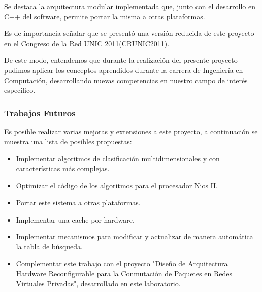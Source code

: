 Se destaca la arquitectura modular implementada que, junto con el desarrollo en C++ del software, permite portar la misma a otras plataformas.

Es de importancia señalar que se presentó una versión reducida de este proyecto en el Congreso de la Red UNIC 2011(CRUNIC2011). 

De este modo, entendemos que durante la realización del presente proyecto pudimos aplicar los conceptos aprendidos durante la carrera de Ingeniería en Computación, desarrollando nuevas competencias en nuestro campo de interés específico.



\subsubsection{Trabajos Futuros}

Es posible realizar varias mejoras y extensiones a este proyecto, a continuación se muestra una lista de posibles propuestas:

\begin{itemize}
	\item Implementar algoritmos de clasificación multidimensionales y con características más complejas.
	\item Optimizar el código de los algoritmos para el procesador Nios II. 
	\item Portar este sistema a otras plataformas.
	\item Implementar una cache por hardware.
	\item Implementar mecanismos para modificar y actualizar de manera automática la tabla de búsqueda.
	\item Complementar este trabajo con el proyecto "Diseño de Arquitectura Hardware Reconfigurable para la Conmutación de Paquetes en Redes Virtuales Privadas"\cite{spaz}, desarrollado en este laboratorio.
\end{itemize}






